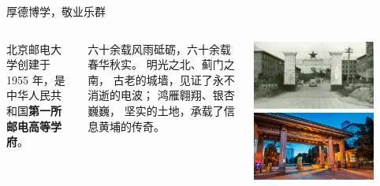 \documentclass[aspectratio=169, utf8]{beamer}
\begin{document}
\begin{frame}{厚德博学，敬业乐群}
    \begin{columns}
        \setlength{\parindent}{2em}

        北京邮电大学创建于 1955 年，是中华人民共和国\textcolor{Fore}{\textbf{第一所邮电高等学府}}。

        六十余载风雨砥砺，六十余载春华秋实。
        明光之北、蓟门之南，
        古老的城墙，见证了永不消逝的电波；
        鸿雁翱翔、银杏巍巍，
        坚实的土地，承载了信息黄埔的传奇。

        \centering
        \includegraphics[width=0.8\textwidth]{./resources/1.jpg}\\%

        \includegraphics[width=0.8\textwidth]{./resources/2.jpg}
    \end{columns}
\end{frame}
\end{document}
